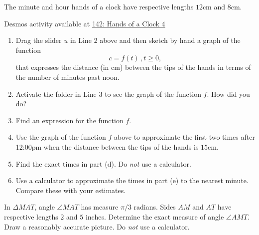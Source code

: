 \documentclass{ximera}
\begin{document}
\begin{question} \label{Q9eergFDhgL}
The minute and hour hands of a clock have respective lengths $12$cm and $8$cm. 

\begin{onlineOnly}
    \begin{center}
\end{center}
\end{onlineOnly}

Desmos activity available at \href{https://www.desmos.com/calculator/sl0k5pvb6h}{142: Hands of a Clock 4}

\begin{enumerate}
\item Drag the slider $u$ in Line 2 above and then sketch by hand a graph of the function
\[
    c = f(t) \, , t\geq 0 ,
\]
that expresses the distance (in cm) between the tips of the hands in terms of the number of minutes past noon.

\item Activate the folder in Line 3 to see the graph of the function $f$. How did you do?

\item Find an expression for the function $f$.

\item Use the graph of the function $f$ above to approximate the first two times after 12:00pm when the distance between the tips of the hands is $15$cm.

\item Find the exact times in part (d). Do \emph{not} use a calculator.

\item Use a calculator to approximate the times in part (e) to the nearest minute. Compare these with your estimates.
\end{enumerate}
\end{question}





\begin{question} \label{Q898dfbfdgdsg}
In $\Delta MAT$, angle $\angle MAT$ has measure $\pi/3$ radians. Sides $AM$ and $AT$ have respective lengths $2$ and $5$ inches. Determine the exact measure of angle $\angle AMT$. Draw a reasonably accurate picture. Do \emph{not} use a calculator.
\end{question}
\end{document}

